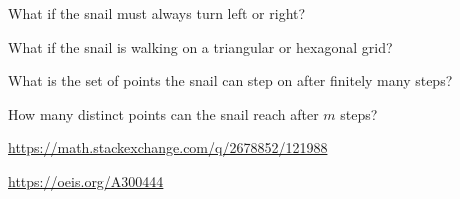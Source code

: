 \documentclass{article}
\begin{document}
\begin{related}
  \item What if the snail must always turn left or right?
  \item What if the snail is walking on a triangular or hexagonal grid?
  \item What is the set of points the snail can step on after finitely many steps?
  \item How many distinct points can the snail reach after $m$ steps?
\end{related}
\begin{references}
  \item \url{https://math.stackexchange.com/q/2678852/121988}
  \item \url{https://oeis.org/A300444}
\end{references}
\end{document}
